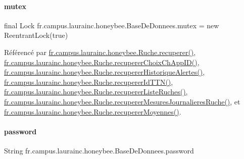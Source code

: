 \paragraph{\texorpdfstring{mutex}{mutex}}
{\footnotesize\ttfamily final Lock fr.\+campus.\+laurainc.\+honeybee.\+Base\+De\+Donnees.\+mutex = new Reentrant\+Lock(true)\hspace{0.3cm}{\ttfamily [static]}}



Référencé par \hyperlink{classfr_1_1campus_1_1laurainc_1_1honeybee_1_1_ruche_a7a99d3c585f2c507eb2c6c265a5bb1fe}{fr.\+campus.\+laurainc.\+honeybee.\+Ruche.\+recuperer()}, \hyperlink{classfr_1_1campus_1_1laurainc_1_1honeybee_1_1_ruche_ade5d681bd0a29d84e0d069169b10a38b}{fr.\+campus.\+laurainc.\+honeybee.\+Ruche.\+recuperer\+Choix\+Ch\+App\+I\+D()}, \hyperlink{classfr_1_1campus_1_1laurainc_1_1honeybee_1_1_ruche_ace10a52a470257f2b8f161fc3c7b9f15}{fr.\+campus.\+laurainc.\+honeybee.\+Ruche.\+recuperer\+Historique\+Alertes()}, \hyperlink{classfr_1_1campus_1_1laurainc_1_1honeybee_1_1_ruche_a1113f3b4a527a801fdf50350667fd212}{fr.\+campus.\+laurainc.\+honeybee.\+Ruche.\+recuperer\+Id\+T\+T\+N()}, \hyperlink{classfr_1_1campus_1_1laurainc_1_1honeybee_1_1_ruche_aba0591cda391b907da41a0afeba4d59d}{fr.\+campus.\+laurainc.\+honeybee.\+Ruche.\+recuperer\+Liste\+Ruches()}, \hyperlink{classfr_1_1campus_1_1laurainc_1_1honeybee_1_1_ruche_a84de3c3af21b1cbeae2075e480acaabc}{fr.\+campus.\+laurainc.\+honeybee.\+Ruche.\+recuperer\+Mesures\+Journalieres\+Ruche()}, et \hyperlink{classfr_1_1campus_1_1laurainc_1_1honeybee_1_1_ruche_a94f815b44f0d5d8682833d6b6e783713}{fr.\+campus.\+laurainc.\+honeybee.\+Ruche.\+recuperer\+Moyennes()}.

\mbox{\label{classfr_1_1campus_1_1laurainc_1_1honeybee_1_1_base_de_donnees_af1bb604a666a7eee9edd93b6cafaf064}} 
\paragraph{\texorpdfstring{password}{password}}
{\footnotesize\ttfamily String fr.\+campus.\+laurainc.\+honeybee.\+Base\+De\+Donnees.\+password\hspace{0.3cm}{\ttfamily [private]}}




